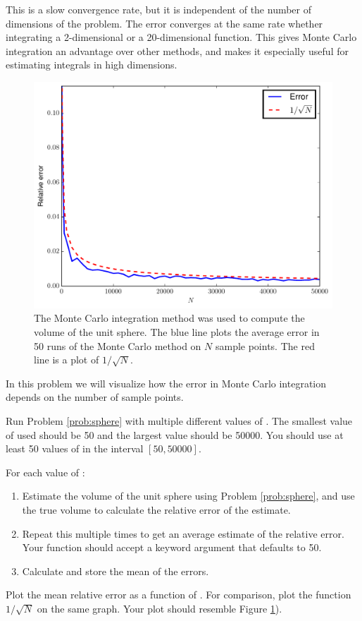 This is a slow convergence rate, but it is independent of the number of dimensions of the problem. 
The error converges at the same rate whether integrating a 2-dimensional or a 20-dimensional function.
This gives Monte Carlo integration an advantage over other methods, and makes it especially useful for estimating integrals in high dimensions.


\begin{figure}
\includegraphics[width=.7\textwidth]{MC_error_2.pdf}
\caption{The Monte Carlo integration method was used to compute the volume of the unit sphere. 
The blue line plots the average error in 50 runs of the Monte Carlo method on $N$ sample points.
The red line is a plot of $1/\sqrt{N}$. }
\label{fig:mc_error_2}
\end{figure}

\begin{problem}
In this problem we will visualize how the error in Monte Carlo integration depends on the number of sample points. 

Run Problem \ref{prob:sphere} with multiple different values of .
The smallest value of  used should be 50 and the largest value should be 50000. 
You should use at least 50 values of  in the interval ${[50,50000]}$.

For each value of : 
\begin{enumerate}
\item Estimate the volume of the unit sphere using Problem \ref{prob:sphere}, and use the true volume to calculate the relative error of the estimate.
\item Repeat this multiple times to get an average estimate of the relative error. Your function should accept a keyword argument  that defaults to 50.
\item Calculate and store the mean of the errors.
\end{enumerate}

Plot the mean relative error as a function of . 
For comparison, plot the function $1/\sqrt{N}$ on the same graph.
Your plot should resemble Figure \ref{fig:mc_error_2}).

\end{problem}

